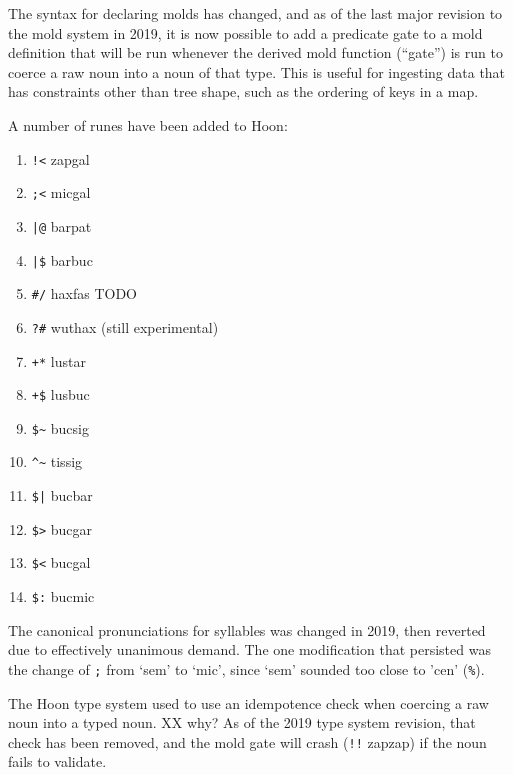 \documentclass[twoside]{article}
\begin{document}
The syntax for declaring molds has changed, and as of the last major revision to the mold system in 2019, it is now possible to add a predicate gate to a mold definition that will be run whenever the derived mold function (``gate'') is run to coerce a raw noun into a noun of that type.  This is useful for ingesting data that has constraints other than tree shape, such as the ordering of keys in a map.

A number of runes have been added to Hoon:

\begin{enumerate}
  \item  \lstinline[style=inlinecode]{!<} zapgal
  \item  \lstinline[style=inlinecode]{;<} micgal
  \item  \lstinline[style=inlinecode]{|@} barpat
  \item  \lstinline[style=inlinecode]{|$} barbuc
  \item  \lstinline[style=inlinecode]{#/} haxfas TODO
  \item  \lstinline[style=inlinecode]{?#} wuthax (still experimental)
  \item  \lstinline[style=inlinecode]{+*} lustar
  \item  \lstinline[style=inlinecode]{+$} lusbuc
  \item  \lstinline[style=inlinecode]{$~} bucsig
  \item  \lstinline[style=inlinecode]{^~} tissig
  \item  \lstinline[style=inlinecode]{$|} bucbar
  \item  \lstinline[style=inlinecode]{$>} bucgar
  \item  \lstinline[style=inlinecode]{$<} bucgal
  \item  \lstinline[style=inlinecode]{$:} bucmic
\end{enumerate}

The canonical pronunciations for syllables was changed in 2019, then reverted due to effectively unanimous demand.  The one modification that persisted was the change of \lstinline[style=inlinecode]{;} from `sem' to `mic', since `sem' sounded too close to 'cen' (\lstinline[style=inlinecode]{%}).

The Hoon type system used to use an idempotence check when coercing a raw noun into a typed noun.  XX why?  As of the 2019 type system revision, that check has been removed, and the mold gate will crash (\lstinline[style=inlinecode]{!!} zapzap) if the noun fails to validate.
\end{document}
